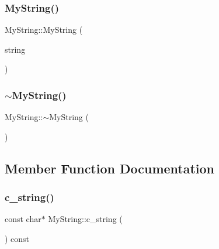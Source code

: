 \mbox{\label{class_my_string_ae24c7cf89a58dd2287303df2ac054c66}} 
\subsubsection{\texorpdfstring{MyString()}{MyString()}\hspace{0.1cm}{\footnotesize\ttfamily [9/9]}}
{\footnotesize\ttfamily My\+String\+::\+My\+String (\begin{DoxyParamCaption}\item[{const \mbox{\hyperlink{class_my_string}{My\+String}} \&}]{string }\end{DoxyParamCaption})\hspace{0.3cm}{\ttfamily [inline]}}

\mbox{\label{class_my_string_a7bee4fe8ad82a0b7b8f65b02054b156b}} 
\subsubsection{\texorpdfstring{$\sim$MyString()}{~MyString()}\hspace{0.1cm}{\footnotesize\ttfamily [3/3]}}
{\footnotesize\ttfamily My\+String\+::$\sim$\+My\+String (\begin{DoxyParamCaption}{ }\end{DoxyParamCaption})\hspace{0.3cm}{\ttfamily [inline]}}



\subsection{Member Function Documentation}
\mbox{\label{class_my_string_aff2af0cf30db39fe24a235670ee6ff25}} 
\subsubsection{\texorpdfstring{c\_string()}{c\_string()}\hspace{0.1cm}{\footnotesize\ttfamily [1/3]}}
{\footnotesize\ttfamily const char$\ast$ My\+String\+::c\+\_\+string (\begin{DoxyParamCaption}{ }\end{DoxyParamCaption}) const\hspace{0.3cm}{\ttfamily [inline]}}

